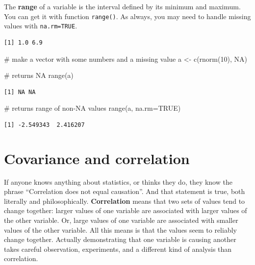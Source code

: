 \documentclass[
  13,
  letterpaper,
]{report}
\newenvironment{Shaded}{\begin{snugshade}}{\end{snugshade}}
\newcommand{\AttributeTok}[1]{\textcolor[rgb]{0.40,0.45,0.13}{#1}}
\newcommand{\CommentTok}[1]{\textcolor[rgb]{0.37,0.37,0.37}{#1}}
\newcommand{\ConstantTok}[1]{\textcolor[rgb]{0.56,0.35,0.01}{#1}}
\newcommand{\DecValTok}[1]{\textcolor[rgb]{0.68,0.00,0.00}{#1}}
\newcommand{\FunctionTok}[1]{\textcolor[rgb]{0.28,0.35,0.67}{#1}}
\newcommand{\NormalTok}[1]{\textcolor[rgb]{0.00,0.23,0.31}{#1}}
\newcommand{\OtherTok}[1]{\textcolor[rgb]{0.00,0.23,0.31}{#1}}
\newcommand{\SpecialCharTok}[1]{\textcolor[rgb]{0.37,0.37,0.37}{#1}}
\begin{document}
The \textbf{range} of a variable is the interval defined by its minimum
and maximum. You can get it with function \texttt{range()}. As always,
you may need to handle missing values with \texttt{na.rm=TRUE}.

\begin{Shaded}
\end{Shaded}

\begin{verbatim}
[1] 1.0 6.9
\end{verbatim}

\begin{Shaded}
\begin{Highlighting}[]
\CommentTok{\# make a vector with some numbers and a missing value}
\NormalTok{a }\OtherTok{\textless{}{-}} \FunctionTok{c}\NormalTok{(}\FunctionTok{rnorm}\NormalTok{(}\DecValTok{10}\NormalTok{), }\ConstantTok{NA}\NormalTok{)}

\CommentTok{\# returns NA}
\FunctionTok{range}\NormalTok{(a)}
\end{Highlighting}
\end{Shaded}

\begin{verbatim}
[1] NA NA
\end{verbatim}

\begin{Shaded}
\begin{Highlighting}[]
\CommentTok{\# returns range of non{-}NA values}
\FunctionTok{range}\NormalTok{(a, }\AttributeTok{na.rm=}\ConstantTok{TRUE}\NormalTok{)}
\end{Highlighting}
\end{Shaded}

\begin{verbatim}
[1] -2.549343  2.416207
\end{verbatim}

\section{Covariance and correlation}\label{sec-desc-co}

If anyone knows anything about statistics, or thinks they do, they know
the phrase ``Correlation does not equal causation''. And that statement
is true, both literally and philosophically. \textbf{Correlation} means
that two sets of values tend to change together: larger values of one
variable are associated with larger values of the other variable. Or,
large values of one variable are associated with smaller values of the
other variable. All this means is that the values seem to reliably
change together. Actually demonstrating that one variable is causing
another takes careful observation, experiments, and a different kind of
analysis than correlation.
\end{document}
